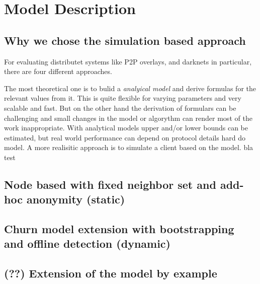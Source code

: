 \chapter{Model Description}

\section{Why we chose the simulation based approach}

For evaluating distributet systems like P2P overlays, and darknets in particular, there are four different approaches.

The most theoretical one is to bulid a \emph{analyical model} and derive formulas for the relevant values from it. This is quite flexible for varying parameters and very scalable and fast. But on the other hand the derivation of formulars can be challenging and small changes in the model or algorythm can render most of the work inappropriate. With analytical models upper and/or lower bounds can be estimated, but real world performance can depend on protocol details hard do model.
A more realisitic approach is to simulate a client based on the model. 
bla
test


\section{Node based with fixed neighbor set and add-hoc anonymity (static)}



\section{Churn model extension with bootstrapping and offline detection (dynamic)}
\section{(??) Extension of the model by example}

